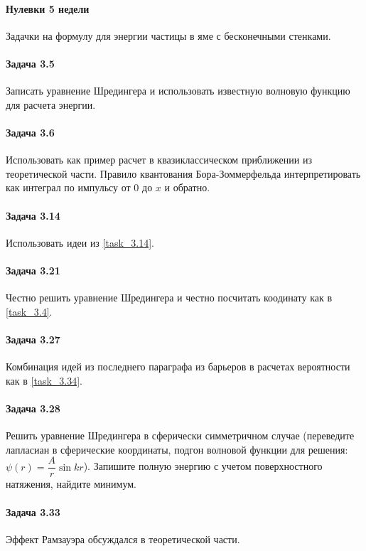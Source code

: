\documentclass[12pt]{article}
\begin{document}
\paragraph{Нулевки 5 недели} Задачки на формулу для энергии частицы в яме с бесконечными стенками.

\paragraph{Задача 3.5} Записать уравнение Шредингера и использовать известную волновую функцию для расчета энергии.

\paragraph{Задача 3.6} Использовать как пример расчет в квазиклассическом приближении из теоретической части. Правило квантования Бора-Зоммерфельда интерпретировать как интеграл по импульсу от 0 до $x$ и обратно.

\paragraph{Задача 3.14} Использовать идеи из \ref{task_3.14}.

\paragraph{Задача 3.21} Честно решить уравнение Шредингера и честно посчитать коодинату как в \ref{task_3.4}.

\paragraph{Задача 3.27} Комбинация идей из последнего параграфа из барьеров в расчетах вероятности как в \ref{task_3.34}.

\paragraph{Задача 3.28} Решить уравнение Шредингера в сферически симметричном случае (переведите лапласиан в сферические координаты, подгон волновой функции для решения: $\psi(r) = \dfrac{A}{r}\sin{kr}$). Запишите полную энергию с учетом поверхностного натяжения, найдите минимум.

\paragraph{Задача 3.33} Эффект Рамзауэра обсуждался в теоретической части.
\end{document}
